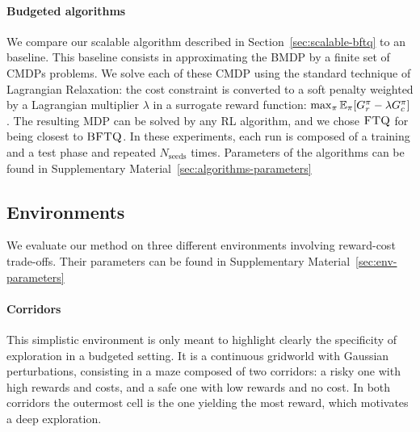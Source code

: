 \documentclass{article}
\begin{document}
\paragraph{Budgeted algorithms} We compare our  scalable \BFTQ algorithm described in Section~\ref{sec:scalable-bftq} to an \FTQl baseline. This baseline consists in approximating the BMDP by a finite set of CMDPs problems. We solve each of these CMDP using the standard technique of Lagrangian Relaxation: the cost constraint is converted to a soft penalty weighted by a Lagrangian multiplier $\lambda$ in a surrogate reward function: $\max_{\pi} \operatorname*{\mathbb{E}}_{\pi}[G_r^\pi - \lambda G_c^\pi]$. The resulting MDP can be solved by any RL algorithm, and we chose $\textrm{\textsc{FTQ}}$ for being closest to $\textrm{\textsc{BFTQ}}$.
In these experiments, each run is composed of a training and a test phase and repeated $N_{\text{seeds}}$ times. Parameters of the algorithms can be found in Supplementary Material~\ref{sec:algorithms-parameters}

\subsection{Environments}

We evaluate our method on three different environments involving reward-cost trade-offs. Their parameters can be found in Supplementary Material~\ref{sec:env-parameters}

\paragraph{Corridors}
This simplistic environment is only meant to highlight clearly the specificity of exploration in a budgeted setting. It is a continuous gridworld with Gaussian perturbations, consisting in a maze composed of two corridors: a risky one with high rewards and costs, and a safe one with low rewards and no cost. In both corridors the outermost cell is the one yielding the most reward, which motivates a deep exploration.
\end{document}
